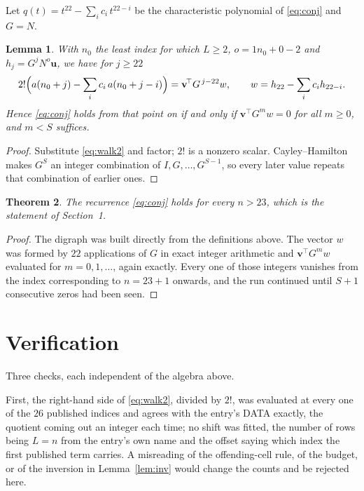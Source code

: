 \documentclass[11pt,a4paper]{article}
\theoremstyle{plain}
\newtheorem{theorem}{Theorem}
\newtheorem{lemma}[theorem]{Lemma}
\theoremstyle{definition}
\begin{document}
Let $q(t)=t^{22}-\sum_i c_i\,t^{22-i}$ be the characteristic polynomial of
\eqref{eq:conj} and $G=N$.

\begin{lemma}\label{lem:crit}
With $n_0$ the least index for which $L\ge2$, $o=1n_0+0-2$ and
$h_j=G^{j}N^{o}\mathbf{u}$, we have for $j\ge22$
\[
2!\Bigl(a(n_0+j)-\sum_i c_i\,a(n_0+j-i)\Bigr)=\mathbf{v}^{\!\top}G^{\,j-22}w,
\qquad w=h_{22}-\sum_i c_i h_{22-i} .
\]
Hence \eqref{eq:conj} holds from that point on if and only if
$\mathbf{v}^{\!\top}G^{m}w=0$ for all $m\ge0$, and $m<S$ suffices.
\end{lemma}

\begin{proof}
Substitute \eqref{eq:walk2} and factor; $2!$ is a nonzero scalar. Cayley--Hamilton
makes $G^{S}$ an integer combination of $I,G,\dots,G^{S-1}$, so every later value repeats
that combination of earlier ones.
\end{proof}

\begin{theorem}
The recurrence \eqref{eq:conj} holds for every $n>23$, which is the statement of
Section~1.
\end{theorem}

\begin{proof}
The digraph was built directly from the definitions above. The vector $w$ was formed by
$22$ applications of $G$ in exact integer arithmetic and $\mathbf{v}^{\!\top}G^{m}w$
evaluated for $m=0,1,\dots$, again exactly. Every one of those integers vanishes from the
index corresponding to $n=23+1$ onwards, and the run continued until $S+1$ consecutive
zeros had been seen.
\end{proof}

\section{Verification}

Three checks, each independent of the algebra above.

First, the right-hand side of \eqref{eq:walk2}, divided by $2!$, was evaluated at every
one of the $26$ published indices and agrees with the entry's DATA exactly, the quotient
coming out an integer each time; no shift was fitted, the number of rows being
$L=n$ from the entry's own name and the offset saying which index the first published
term carries. A misreading of the offending-cell rule, of the budget, or of the inversion in
Lemma~\ref{lem:inv} would change the counts and be rejected here.
\end{document}
